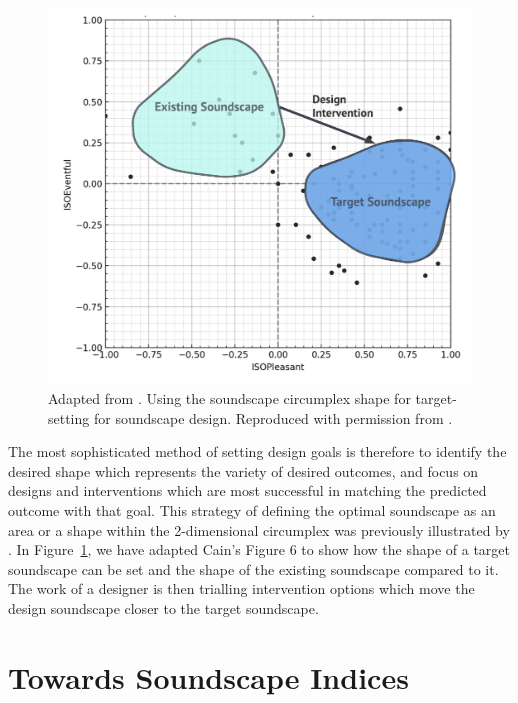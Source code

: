 \documentclass[
  authoryear,
  preprint,
  1p]{elsarticle}
\begin{document}
\begin{figure}

{\centering \includegraphics{CainCircumplexTarget.png}

}

\caption{\label{fig-cain}Adapted from \citet{Cain2013development}. Using
the soundscape circumplex shape for target-setting for soundscape
design. Reproduced with permission from \citet{Mitchell2022Predictive}.}

\end{figure}

The most sophisticated method of setting design goals is therefore to
identify the desired shape which represents the variety of desired
outcomes, and focus on designs and interventions which are most
successful in matching the predicted outcome with that goal. This
strategy of defining the optimal soundscape as an area or a shape within
the 2-dimensional circumplex was previously illustrated by
\citet{Cain2013development}. In Figure~\ref{fig-cain}, we have adapted
Cain's Figure 6 to show how the shape of a target soundscape can be set
and the shape of the existing soundscape compared to it. The work of a
designer is then trialling intervention options which move the design
soundscape closer to the target soundscape.

\hypertarget{towards-soundscape-indices}{%
\section{Towards Soundscape Indices}\label{towards-soundscape-indices}}
\end{document}
